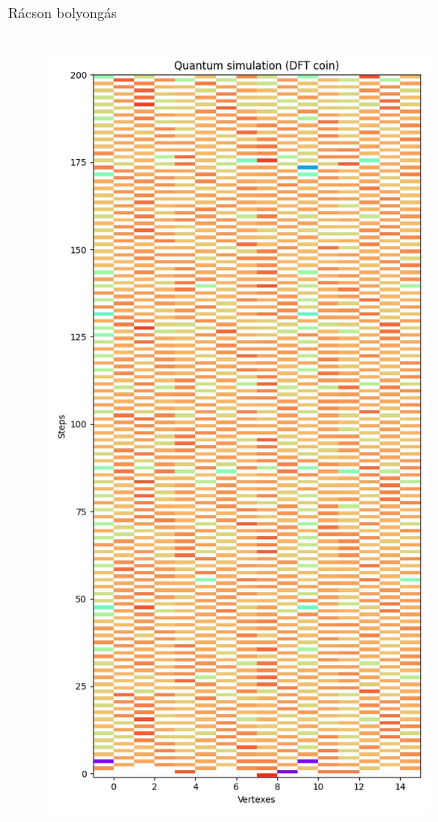 \documentclass[aspectratio=169]{beamer}
\begin{document}
\begin{frame}{Rácson bolyongás}
\begin{columns}[onlytextwidth]
\begin{column}{.23\textwidth}
\begin{figure}
        \includegraphics[width=0.9\textwidth]{./tdk_figures/results/grid/dft.jpg}
      \end{figure}
    \end{column}
  \end{columns}
\end{frame}
\end{document}
